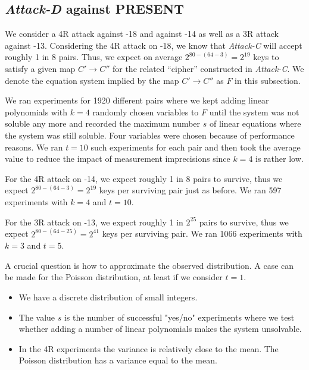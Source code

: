 \subsection{\emph{Attack-D} against PRESENT}
\label{sec:attack-d-present}
We consider a 4R attack against -18 and against -14 as well as a 3R attack against -13. Considering the 4R attack on -18, we know that \emph{Attack-C} will accept roughly 1 in 8 pairs. Thus, we expect on average $2^{80 - (64 - 3)} = 2^{19}$ keys to satisfy a given map $C' \rightarrow C''$ for the related ``cipher'' constructed in \emph{Attack-C}. We denote the equation system implied by the map $C' \rightarrow C''$ as $F$ in this subsection.

We ran experiments for 1920 different pairs where we kept adding linear polynomials with $k=4$ randomly chosen variables to $F$ until the system was not soluble any more and recorded the maximum number $s$ of linear equations where the system was still soluble. Four variables were chosen because of performance reasons. We ran $t=10$ such experiments for each pair and then took the average value to reduce the impact of measurement imprecisions since $k=4$ is rather low.

For the 4R attack on -14, we expect roughly 1 in 8 pairs to survive, thus we expect $2^{80 - (64-3)} = 2^{19}$ keys per surviving pair just as before. We ran 597 experiments with $k=4$ and $t=10$.

For the 3R attack on -13, we expect roughly 1 in $2^{25}$ pairs to survive, thus we expect $2^{80 - (64-25)} = 2^{41}$ keys per surviving pair. We ran 1066 experiments with $k=3$ and $t=5$.

A crucial question is how to approximate the observed distribution. A case can be made for the Poisson distribution, at least if we consider $t=1$.
\begin{itemize}
 \item We have a discrete distribution of small integers.
 \item The value $s$ is the number of successful "yes/no" experiments where we test whether adding a number of linear polynomials makes the system unsolvable.
 \item In the 4R experiments the variance is relatively close to the mean. The Poisson distribution has a variance equal to the mean.
\end{itemize}

